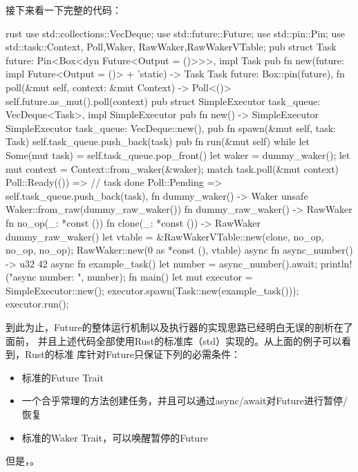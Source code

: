 接下来看一下完整的代码：
\begin{code-block}{rust}
use std::collections::VecDeque;
use std::future::Future;
use std::pin::Pin;
use std::task::{Context, Poll,Waker, RawWaker,RawWakerVTable};
pub struct Task {
    future: Pin<Box<dyn Future<Output = ()>>>,
}
impl Task {
    pub fn new(future: impl Future<Output = ()> + 'static) -> Task {
        Task { future: Box::pin(future), }
    }
    fn poll(&mut self, context: &mut Context) -> Poll<()> {
        self.future.as_mut().poll(context)
    }
}
pub struct SimpleExecutor { task_queue: VecDeque<Task>, }
impl SimpleExecutor {
    pub fn new() -> SimpleExecutor {
        SimpleExecutor { task_queue: VecDeque::new(), }
    }
    pub fn spawn(&mut self, task: Task) {
        self.task_queue.push_back(task)
    }
    pub fn run(&mut self) {
        while let Some(mut task) = self.task_queue.pop_front() {
            let waker = dummy_waker();
            let mut context = Context::from_waker(&waker);
            match task.poll(&mut context) {
                Poll::Ready(()) => {} // task done
                Poll::Pending => self.task_queue.push_back(task),
            }
        }
    }
}
fn dummy_waker() -> Waker {
    unsafe { Waker::from_raw(dummy_raw_waker()) }
}
fn dummy_raw_waker() -> RawWaker {
    fn no_op(_: *const ()) {}
    fn clone(_: *const ()) -> RawWaker { dummy_raw_waker() }
    let vtable = &RawWakerVTable::new(clone, no_op, no_op, no_op);
    RawWaker::new(0 as *const (), vtable)
}
async fn async_number() -> u32 { 42 }
async fn example_task() {
    let number = async_number().await;
    println!("async number: {}", number);
}
fn main() {
    let mut executor = SimpleExecutor::new();
    executor.spawn(Task::new(example_task()));
    executor.run();
}
\end{code-block}

到此为止，Future的整体运行机制以及执行器的实现思路已经明白无误的剖析在了面前，
并且上述代码全部使用Rust的标准库（std）实现的。从上面的例子可以看到，Rust的标准
库针对Future只保证下列的必需条件：
\begin{itemize}
  \item 标准的Future Trait
  \item 一个合乎常理的方法创建任务，并且可以通过async/await对Future进行暂停/恢复
  \item 标准的Waker Trait，可以唤醒暂停的Future
\end{itemize}
但是，。

